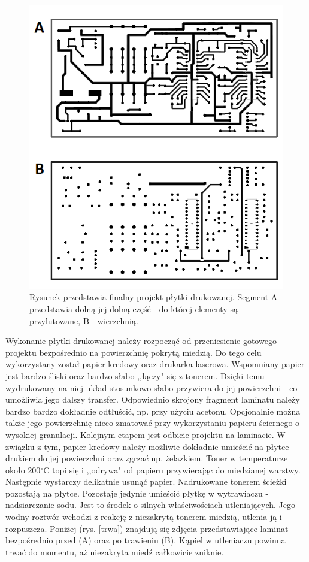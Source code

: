    \begin{figure}[H]
    \begin{center}
      \includegraphics[scale=0.85]{imgs/plytka.png}
 	\caption[Projekt płytki drukowanej.]{\small{Rysunek przedstawia finalny projekt płytki drukowanej. Segment A przedstawia dolną jej dolną część - do której elementy są przylutowane, B - wierzchnią. }}
	\label{plyta}
    \end{center}
  \end{figure}   
Wykonanie płytki drukowanej należy rozpocząć od przeniesienie gotowego projektu bezpośrednio na powierzchnię pokrytą miedzią. Do tego celu wykorzystany został papier kredowy oraz drukarka laserowa. Wspomniany papier jest bardzo śliski oraz bardzo słabo ,,łączy" się z tonerem. Dzięki temu wydrukowany na niej układ stosunkowo słabo przywiera do jej powierzchni - co umożliwia jego dalszy transfer. Odpowiednio skrojony fragment laminatu należy bardzo bardzo dokładnie odtłuścić, np. przy użyciu acetonu. Opcjonalnie można także jego powierzchnię nieco zmatować przy wykorzystaniu papieru ściernego o wysokiej granulacji. Kolejnym etapem jest odbicie projektu na laminacie. W związku z tym, papier kredowy należy możliwie dokładnie umieścić na płytce drukiem do jej powierzchni oraz zgrzać np. żelazkiem. Toner w temperaturze około 200$^\circ$C topi się i ,,odrywa" od papieru przywierając do miedzianej warstwy. Następnie wystarczy delikatnie usunąć papier. Nadrukowane tonerem ścieżki pozostają na płytce. Pozostaje jedynie umieścić płytkę w wytrawiaczu - nadsiarczanie sodu. Jest to środek o silnych właściwościach utleniających. Jego wodny roztwór wchodzi z reakcję z niezakrytą tonerem miedzią, utlenia ją i rozpuszcza.  Poniżej (rys. \ref{trwa}) znajdują się zdjęcia przedstawiające laminat bezpośrednio przed (A) oraz po trawieniu (B). Kąpiel w utleniaczu powinna trwać do momentu, aż niezakryta miedź całkowicie zniknie.

